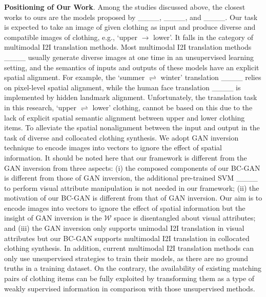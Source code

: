 	\textbf{Positioning of Our Work}. Among the studies discussed above, the closest works to ours are the models proposed by ____, ____, and ____. Our task is expected to take an image of given clothing as input and produce diverse and compatible images of clothing, e.g., `upper $\rightarrow$ lower'. It falls in the category of multimodal I2I translation methods. Most multimodal I2I translation methods ____ usually generate diverse images at one time in an unsupervised learning setting, and the semantics of inputs and outputs of these models have an explicit spatial alignment. For example, the `summer $\rightleftharpoons$ winter' translation ____ relies on pixel-level spatial alignment, while the human face translation ____ is implemented by hidden landmark alignment. Unfortunately, the translation task in this research, `upper $\rightleftharpoons$ lower' clothing, cannot be based on this due to the lack of explicit spatial semantic alignment between upper and lower clothing items. To alleviate the spatial nonalignment between the input and output in the task of diverse and collocated clothing synthesis. We adopt GAN inversion technique to encode images into vectors to ignore the effect of spatial information. It should be noted here that our framework is different from the GAN inversion from three aspects: (i) the composed components of our BC-GAN is different from those of GAN inversion, the additional pre-trained SVM ____ to perform visual attribute manipulation is not needed in our framework; (ii) the motivation of our BC-GAN is different from that of GAN inversion. Our aim is to encode images into vectors to ignore the effect of spatial information but the insight of GAN inversion is the $\mathcal{W}$ space is disentangled about visual attributes; and (iii) the GAN inversion only supports unimodal I2I translation in visual attributes but our BC-GAN supports multimodal I2I translation in collocated clothing synthesis.
	In addition, current multimodal I2I translation methods can only use unsupervised strategies to train their models, as there are no ground truths in a training dataset. On the contrary, the availability of existing matching pairs of clothing items can be fully exploited by transforming them as a type of weakly supervised information in comparison with those unsupervised methods.